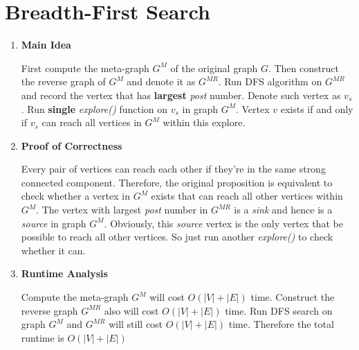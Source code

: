 \documentclass[11pt]{article}
\newenvironment{qparts}{\begin{enumerate}[{(}a{)}]}{\end{enumerate}}
\begin{document}
\newpage
\section{Breadth-First Search}

\begin{qparts}

	\item \textbf{Main Idea}
	
	First compute the meta-graph $G^M$ of the original graph $G$. Then construct the reverse graph of $G^M$ and denote it as $G^{MR}$. Run DFS algorithm on $G^{MR}$ and record the vertex that has \textbf{largest} \textit{post} number. Denote such vertex as $v_s$. Run \textbf{single} \textit{explore()} function on $v_s$ in graph $G^M$. Vertex $v$ exists if and only if $v_s$ can reach all vertices in $G^{M}$ within this explore.
	
	\item \textbf{Proof of Correctness}
	
	Every pair of vertices can reach each other if they're in the same strong connected component. Therefore, the original proposition is equivalent to check whether a vertex in $G^M$ exists that can reach all other vertices within $G^M$. The vertex with largest \textit{post} number in $G^{MR}$ is a \textit{sink} and hence is a \textit{source} in graph $G^M$. Obviously, this \textit{source} vertex is the only vertex that be possible to reach all other vertices. So just run another \textit{explore()} to check whether it can.
			
	\item \textbf{Runtime Analysis}
	
	Compute the meta-graph $G^M$ will cost $O(|V| + |E|)$ time. Construct the reverse graph $G^{MR}$ also will cost $O(|V| + |E|)$ time. Run DFS search on graph $G^M$ and $G^{MR}$ will still cost $O(|V| + |E|)$ time. Therefore the total runtime is $O(|V|+|E|)$

\end{qparts}
\end{document}
